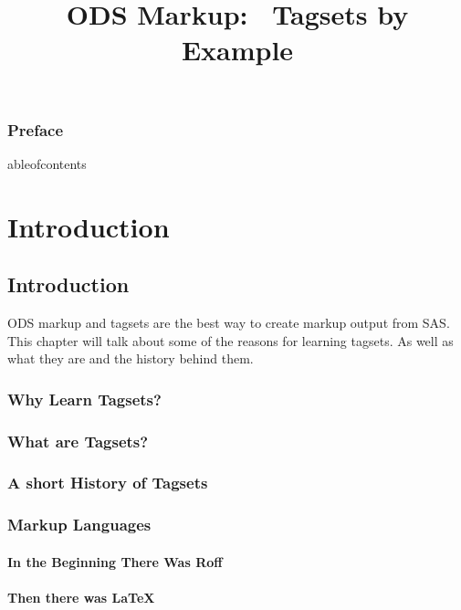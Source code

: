 \documentclass{book}
\begin{document}
\fancyhead{} %
\fancyhead[LO,RE]{\thepage}
\fancyhead[RO]{}
\fancyhead[LE]{}
\fancyfoot[CO,CE]{}
\frontmatter
\title{ODS Markup: \
Tagsets by Example}
\renewcommand{\today}{September 22, 2003}
\maketitle
  \section*{Preface}

\cleardoublepage
	ableofcontents
\cleardoublepage
\mainmatter
\cleardoublepage
{}
\setlength{\headrulewidth}{1pt}
\lhead[\thepage]{\sl\rightmark}
\rhead[\sl\leftmark]{\thepage}
\part{Introduction}
\chapter{Introduction}
ODS markup and tagsets are the best way to create markup output
from SAS.  This chapter will talk about some of the reasons for
learning tagsets.  As well as what they are and the history 
behind them.
\section{Why Learn Tagsets?}

\section{What are Tagsets?}

\section{A short History of Tagsets}

\section{Markup Languages}

\subsection{In the Beginning There Was Roff}

\subsection{Then there was LaTeX}
\end{document}
